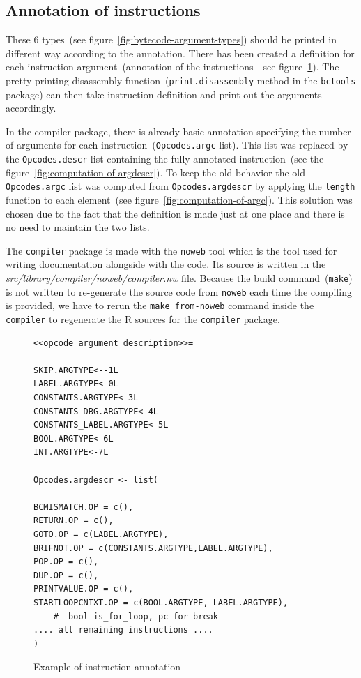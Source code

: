 \documentclass[thesis=M,english]{FITthesis}[2018/10/20]
\newcommand{\code}[1]{\texttt{#1}}
\begin{document}
\subsection{Annotation of instructions}\label{annotation-of-instructions}
These 6 types~(see figure~\ref{fig:bytecode-argument-types}) should be printed in different way according to the annotation. There has been created a definition for each instruction argument~(annotation of the instructions - see figure~\ref{fig:instruction-annotation-example}). The pretty printing disassembly function~(\code{print.disassembly} method in the \code{bctools} package) can then take instruction definition and print out the arguments accordingly.

In the compiler package, there is already basic annotation specifying the number of arguments for each instruction~(\code{Opcodes.argc} list). This list was replaced by the \code{Opcodes.descr} list containing the fully annotated instruction~(see the figure~\ref{fig:computation-of-argdescr}). To keep the old behavior the old \code{Opcodes.argc} list was computed from \code{Opcodes.argdescr} by applying the \code{length} function to each element~(see figure~\ref{fig:computation-of-argc}). This solution was chosen due to the fact that the definition is made just at one place and there is no need to maintain the two lists.

The \code{compiler} package is made with the \code{noweb} tool which is the tool used for writing documentation alongside with the code. Its source is written in the \textit{src/library/compiler/noweb/compiler.nw} file. Because the build command~(\code{make}) is not written to re-generate the source code from \code{noweb} each time the compiling is provided, we have to rerun the \code{make from-noweb} command inside the \code{compiler} to regenerate the R sources for the \code{compiler} package.

\begin{figure}[!h]
\begin{lstlisting}
<<opcode argument description>>=

SKIP.ARGTYPE<--1L
LABEL.ARGTYPE<-0L
CONSTANTS.ARGTYPE<-3L
CONSTANTS_DBG.ARGTYPE<-4L
CONSTANTS_LABEL.ARGTYPE<-5L
BOOL.ARGTYPE<-6L
INT.ARGTYPE<-7L

Opcodes.argdescr <- list(

BCMISMATCH.OP = c(),
RETURN.OP = c(),
GOTO.OP = c(LABEL.ARGTYPE),
BRIFNOT.OP = c(CONSTANTS.ARGTYPE,LABEL.ARGTYPE),
POP.OP = c(),
DUP.OP = c(),
PRINTVALUE.OP = c(),
STARTLOOPCNTXT.OP = c(BOOL.ARGTYPE, LABEL.ARGTYPE),
    #  bool is_for_loop, pc for break
.... all remaining instructions ....
)
\end{lstlisting}
	\caption{Example of instruction annotation}\label{fig:instruction-annotation-example}
\end{figure}
\end{document}
